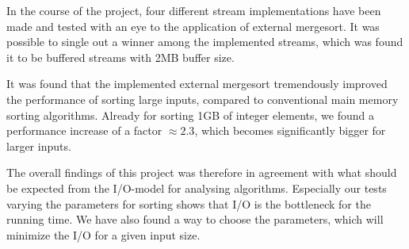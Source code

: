 In the course of the project, four different stream implementations
have been made and tested with an eye to the application of external
mergesort. It was possible to single out a winner among the
implemented streams, which was found it to be buffered streams with
2MB buffer size.

It was found that the implemented external mergesort tremendously
improved the performance of sorting large inputs, compared to
conventional main memory sorting algorithms. Already for sorting 1GB of
integer elements, we found a performance increase of a factor $\approx
2.3$, which becomes significantly bigger for larger inputs.

The overall findings of this project was therefore in agreement with
what should be expected from the I/O-model for analysing
algorithms. Especially our tests varying the parameters for sorting
shows that I/O is the bottleneck for the running time. We have also
found a way to choose the parameters, which will minimize the I/O for
a given input size.
